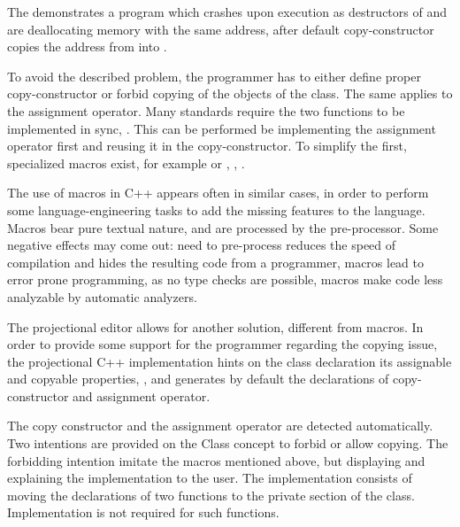 
The  demonstrates a program which crashes upon execution as destructors of  and  are deallocating 
memory with the same address, after default copy-constructor copies the address from  into .

To avoid the described problem, the programmer has to either define proper copy-constructor or forbid copying of the objects of
the class. The same applies to the assignment operator. Many standards require the two functions to be implemented in sync, \cite{ooocpp}.
This can be performed be implementing the assignment operator first and reusing it in the copy-constructor. To simplify the first,
specialized macros exist, for example  or , \cite{googlecppstyle}, \cite{qobjref}.

The use of macros in C++ appears often in similar cases, in order to perform some language-engineering tasks to add the missing
features to the language. Macros bear pure textual nature, and are processed by the pre-processor. Some negative effects may 
come out: need to pre-process reduces the speed of compilation and hides the resulting code from a programmer, macros lead
to error prone programming, as no type checks are possible, macros make code less analyzable by automatic analyzers.



The projectional editor allows for another solution, different from macros.  In order to provide some support for the 
programmer regarding the copying issue, the projectional C++ implementation hints on the class declaration its 
assignable and copyable properties, , and generates by default the declarations of copy-constructor and assignment operator.

The copy constructor and the assignment operator are detected automatically. Two intentions are provided on the Class concept to
forbid or allow copying. The forbidding intention imitate the macros mentioned above, but displaying and explaining the 
implementation to the user. The implementation consists of moving the declarations of two functions to the private section of
the class. Implementation is not required for such functions.


